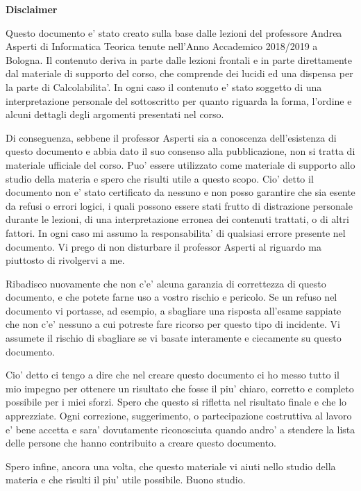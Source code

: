 %
%
%
%
\thispagestyle{plain}
\begin{center}
    \Large
    \textbf{Disclaimer}
\end{center}

Questo documento e' stato creato sulla base dalle lezioni del professore Andrea Asperti di
Informatica Teorica tenute nell'Anno Accademico 2018/2019 a Bologna. Il contenuto deriva in parte
dalle lezioni frontali e in parte direttamente dal materiale di supporto del corso, che comprende
dei lucidi ed una dispensa per la parte di Calcolabilita'. In ogni caso il contenuto e' stato
soggetto di una interpretazione personale del sottoscritto per quanto riguarda la forma, l'ordine e
alcuni dettagli degli argomenti presentati nel corso.

Di conseguenza, sebbene il professor Asperti sia a conoscenza dell'esistenza di questo documento e
abbia dato il suo consenso alla pubblicazione, non si tratta di materiale ufficiale del corso. Puo'
essere utilizzato come materiale di supporto allo studio della materia e spero che risulti utile a
questo scopo. Cio' detto il documento non e' stato certificato da nessuno e non posso garantire che
sia esente da refusi o errori logici, i quali possono essere stati frutto di distrazione personale
durante le lezioni, di una interpretazione erronea dei contenuti trattati, o di altri fattori. In
ogni caso mi assumo la responsabilita' di qualsiasi errore presente nel documento. Vi prego di non
disturbare il professor Asperti al riguardo ma piuttosto di rivolgervi a me.

Ribadisco nuovamente che non c'e' alcuna garanzia di correttezza di questo documento, e che potete
farne uso a vostro rischio e pericolo. Se un refuso nel documento vi portasse, ad esempio, a
sbagliare una risposta all'esame sappiate che non c'e' nessuno a cui potreste fare ricorso per
questo tipo di incidente. Vi assumete il rischio di sbagliare se vi basate interamente e ciecamente
su questo documento.

Cio' detto ci tengo a dire che nel creare questo documento ci ho messo tutto il mio impegno per
ottenere un risultato che fosse il piu' chiaro, corretto e completo possibile per i miei sforzi.
Spero che questo si rifletta nel risultato finale e che lo apprezziate. Ogni correzione,
suggerimento, o partecipazione costruttiva al lavoro e' bene accetta e sara' dovutamente
riconosciuta quando andro' a stendere la lista delle persone che hanno contribuito a creare questo
documento.

Spero infine, ancora una volta, che questo materiale vi aiuti nello studio della materia e che
risulti il piu' utile possibile. Buono studio.
